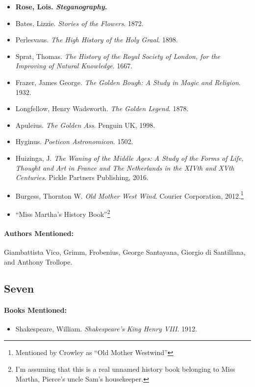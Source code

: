 \documentclass[12pt]{article}
\providecommand{\tightlist}{%
  \setlength{\itemsep}{0pt}\setlength{\parskip}{0pt}}
\begin{document}
\begin{itemize}
\tightlist
\item
  \textbf{Rose, Lois. \emph{Steganography}.}
\item
  Bates, Lizzie. \emph{Stories of the Flowers}. 1872.
\item
  Perlesvaus. \emph{The High History of the Holy Graal}. 1898.
\item
  Sprat, Thomas. \emph{The History of the Royal Society of London, for the Improving of Natural Knowledge}. 1667.
\item
  Frazer, James George. \emph{The Golden Bough: A Study in Magic and Religion}. 1932.
\item
  Longfellow, Henry Wadsworth. \emph{The Golden Legend}. 1878.
\item
  Apuleius. \emph{The Golden Ass}. Penguin UK, 1998.
\item
  Hyginus. \emph{Poeticon Astronomicon}. 1502.
\item
  Huizinga, J. \emph{The Waning of the Middle Ages: A Study of the Forms of Life, Thought and Art in France and The Netherlands in the XIVth and XVth Centuries}. Pickle Partners Publishing, 2016.
\item
  Burgess, Thornton W. \emph{Old Mother West Wind}. Courier Corporation, 2012.\footnote{Mentioned by Crowley as ``Old Mother Westwind''}
\item
  ``Miss Martha's History Book''\footnote{I'm assuming that this is a real unnamed history book belonging to Miss Martha, Pierce's uncle Sam's housekeeper.}
\end{itemize}

\paragraph{Authors Mentioned:}\label{authors-mentioned-4}

Giambattista Vico, Grimm, Frobenius, George Santayana, Giorgio di Santillana, and Anthony Trollope.

\subsection{Seven}\label{seven}

\paragraph{Books Mentioned:}\label{books-mentioned-8}

\begin{itemize}
\tightlist
\item
  Shakespeare, William. \emph{Shakespeare's King Henry VIII}. 1912.
\end{itemize}
\end{document}

